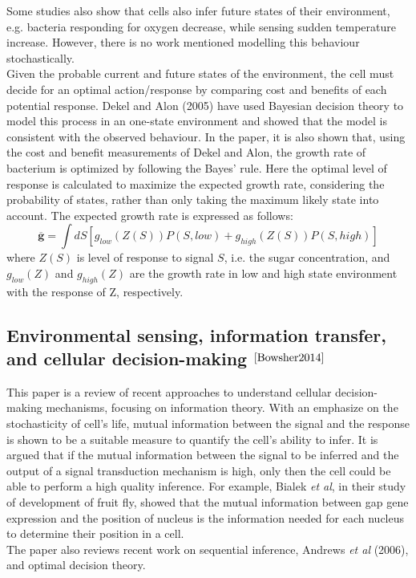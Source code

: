 \documentclass[]{article}
\begin{document}
Some studies also show that cells also infer future states of their environment, e.g. bacteria responding for oxygen decrease, while sensing sudden temperature increase. However, there is no work mentioned modelling this behaviour stochastically.\\
Given the probable current and future states of the environment, the cell must decide for an optimal action/response by comparing cost and benefits of each potential response. Dekel and Alon (2005) have used Bayesian decision theory to model this process in an one-state environment and showed that the model is consistent with the observed behaviour. In the paper, it is also shown that, using the cost and benefit measurements of Dekel and Alon, the growth rate of bacterium is optimized by following the Bayes' rule. Here the optimal level of response is calculated to maximize the expected growth rate, considering the probability of states, rather than only taking the maximum likely state into account. The expected growth rate is expressed as follows:
\begin{equation}
\overline{\mathbf{g}}=\int d S\left[g_{low}(Z(S)) P(S, { low })+g_{ {high }}(Z(S)) P(S,{ high })\right]
\end{equation}
where $ Z(S) $ is level of response to signal $ S $, i.e. the sugar concentration, and $ g_{low}(Z) $ and $ g_{high}(Z) $ are the growth rate in low and high state environment with the response of Z, respectively. 

\subsection{Environmental sensing, information transfer, and cellular decision-making $ ^{\cite{Bowsher2014}} $}
This paper is a review of recent approaches to understand cellular decision-making mechanisms, focusing on information theory. With an emphasize on the stochasticity of cell's life, mutual information between the signal and the response is shown to be a suitable measure to quantify the cell's ability to infer. It is argued that if the mutual information between the signal to be inferred and the output of a signal transduction mechanism is high, only then the cell could be able to perform a high quality inference. For example, Bialek \textit{et al}, in their study of development of fruit fly, showed that the mutual information between gap gene expression and the position of nucleus is the information needed for each nucleus to determine their position in a cell. \\
The paper also reviews recent work on sequential inference, Andrews \textit{et al} (2006), and optimal decision theory.
\end{document}
